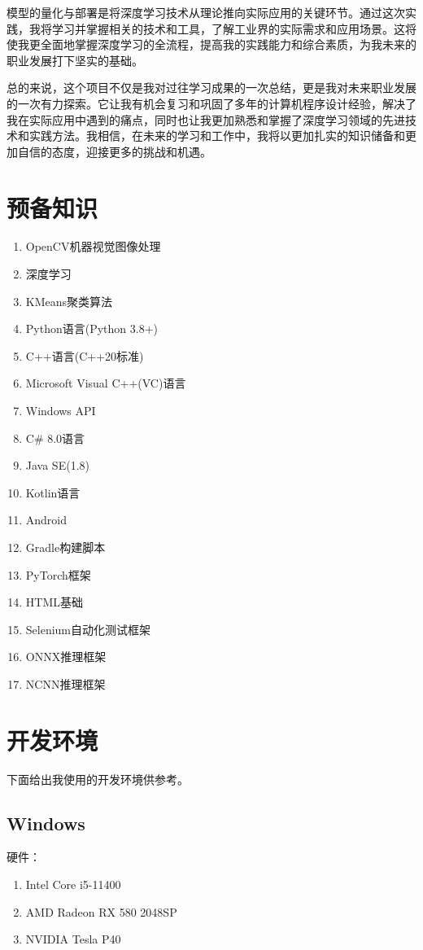 模型的量化与部署是将深度学习技术从理论推向实际应用的关键环节。通过这次实践，我将学习并掌握相关的技术和工具，了解工业界的实际需求和应用场景。这将使我更全面地掌握深度学习的全流程，提高我的实践能力和综合素质，为我未来的职业发展打下坚实的基础。

总的来说，这个项目不仅是我对过往学习成果的一次总结，更是我对未来职业发展的一次有力探索。它让我有机会复习和巩固了多年的计算机程序设计经验，解决了我在实际应用中遇到的痛点，同时也让我更加熟悉和掌握了深度学习领域的先进技术和实践方法。我相信，在未来的学习和工作中，我将以更加扎实的知识储备和更加自信的态度，迎接更多的挑战和机遇。

\section{预备知识}

\begin{enumerate}
	\item OpenCV机器视觉图像处理
	\item 深度学习
	\item KMeans聚类算法
	\item Python语言(Python 3.8+)
	\item C++语言(C++20标准)
	\item Microsoft Visual C++(VC)语言
	\item Windows API
	\item C\# 8.0语言
	\item Java SE(1.8)
	\item Kotlin语言
	\item Android
	\item Gradle构建脚本
	\item PyTorch框架
	\item HTML基础
	\item Selenium自动化测试框架
	\item ONNX推理框架
	\item NCNN推理框架
\end{enumerate}

\section{开发环境}

下面给出我使用的开发环境供参考。

\subsection{Windows}

硬件：
\begin{enumerate}
	\item Intel Core i5-11400
	\item AMD Radeon RX 580 2048SP
	\item NVIDIA Tesla P40
\end{enumerate}

